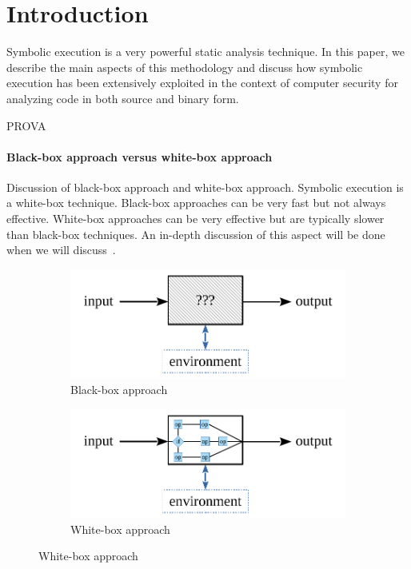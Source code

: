 
\section{Introduction}

Symbolic execution is a very powerful static analysis technique. In this paper, we describe the main aspects of this methodology and discuss how symbolic execution has been extensively exploited in the context of computer security for analyzing code in both source and binary form.

PROVA

\paragraph{Black-box approach versus white-box approach}

Discussion of black-box approach and white-box approach. Symbolic execution is a white-box technique. Black-box approaches can be very fast but not always effective. White-box approaches can be very effective but are typically slower than black-box techniques. An in-depth discussion of this aspect will be done when we will discuss~\cite{DRILLER-NDSS16}.

\begin{figure}[H]
  \vspace{-3mm}
  \centering
  \begin{subfigure}{.5\textwidth}
    \centering
    \includegraphics[width=0.9\linewidth]{images/blackbox} 
    \caption{Black-box approach}
  \end{subfigure}%
  \begin{subfigure}{.5\textwidth}
    \centering
    \includegraphics[width=0.9\linewidth]{images/whitebox} 
    \caption{White-box approach}
  \end{subfigure}
  \vspace{-3mm}
\end{figure}
